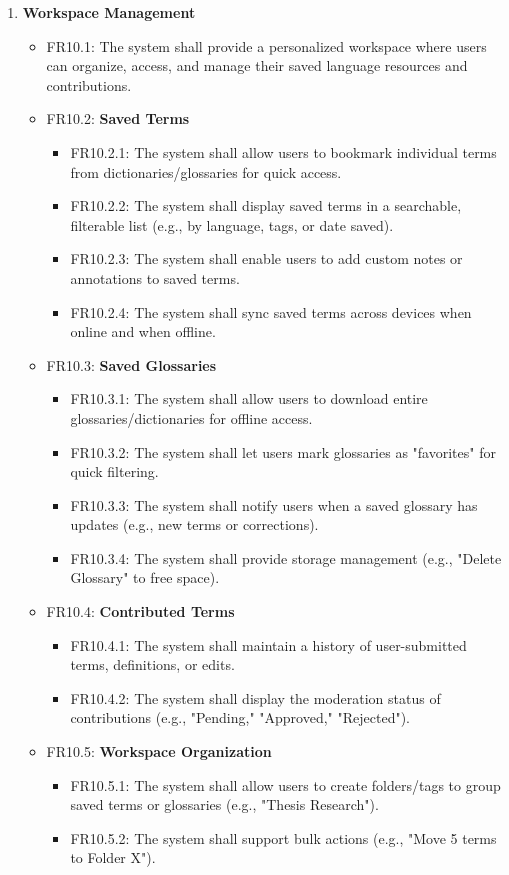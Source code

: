 \documentclass[12pt]{article}
\begin{document}
\begin{enumerate}[label=FR\arabic*:, leftmargin=2.5em]
    \item \textbf{Workspace Management}
    \begin{itemize}
        \item FR10.1: The system shall provide a personalized workspace where users can organize, access, and manage their saved language resources and contributions.
        \item FR10.2: \textbf{Saved Terms}
        \begin{itemize}
            \item FR10.2.1: The system shall allow users to bookmark individual terms from dictionaries/glossaries for quick access.
            \item FR10.2.2: The system shall display saved terms in a searchable, filterable list (e.g., by language, tags, or date saved).
            \item FR10.2.3: The system shall enable users to add custom notes or annotations to saved terms.
            \item FR10.2.4: The system shall sync saved terms across devices when online and when offline.
        \end{itemize}
        \item FR10.3: \textbf{Saved Glossaries}
        \begin{itemize}
            \item FR10.3.1: The system shall allow users to download entire glossaries/dictionaries for offline access.
            \item FR10.3.2: The system shall let users mark glossaries as "favorites" for quick filtering.
            \item FR10.3.3: The system shall notify users when a saved glossary has updates (e.g., new terms or corrections).
            \item FR10.3.4: The system shall provide storage management (e.g., "Delete Glossary" to free space).
        \end{itemize}
        \item FR10.4: \textbf{Contributed Terms}
        \begin{itemize}
            \item FR10.4.1: The system shall maintain a history of user-submitted terms, definitions, or edits.
            \item FR10.4.2: The system shall display the moderation status of contributions (e.g., "Pending," "Approved," "Rejected").
        \end{itemize}
        \item FR10.5: \textbf{Workspace Organization}
        \begin{itemize}
            \item FR10.5.1: The system shall allow users to create folders/tags to group saved terms or glossaries (e.g., "Thesis Research").
            \item FR10.5.2: The system shall support bulk actions (e.g., "Move 5 terms to Folder X").
        \end{itemize}
    \end{itemize}

\end{enumerate}
\end{document}
